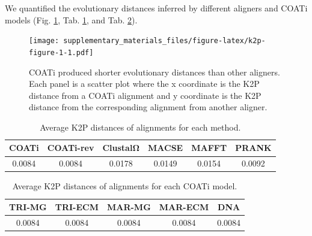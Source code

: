 \documentclass[
]{article}
\begin{document}
We quantified the evolutionary distances inferred by different aligners and COATi models (Fig. \ref{fig:k2p-figure-1}, Tab. \ref{tab:k2p-table-1}, and Tab. \ref{tab:k2p-table-2}).

\begin{figure}
\centering
\texttt{[image: supplementary\_materials\_files/figure-latex/k2p-figure-1-1.pdf]}
\caption{\label{fig:k2p-figure-1}COATi produced shorter evolutionary distances than other aligners. Each panel is a scatter plot where the x coordinate is the K2P distance from a COATi alignment and y coordinate is the K2P distance from the corresponding alignment from another aligner.}
\end{figure}

\begin{table}[H]

\caption{\label{tab:k2p-table-1}Average K2P distances of alignments for each method.}
\centering
\begin{tabular}[t]{cccccc}
\toprule
COATi & COATi-rev & ClustalΩ & MACSE & MAFFT & PRANK\\
\midrule
0.0084 & 0.0084 & 0.0178 & 0.0149 & 0.0154 & 0.0092\\
\bottomrule
\end{tabular}
\end{table}

\begin{table}[H]

\caption{\label{tab:k2p-table-2}Average K2P distances of alignments for each COATi model.}
\centering
\begin{tabular}[t]{ccccc}
\toprule
TRI-MG & TRI-ECM & MAR-MG & MAR-ECM & DNA\\
\midrule
0.0084 & 0.0084 & 0.0084 & 0.0084 & 0.0084\\
\bottomrule
\end{tabular}
\end{table}
\end{document}
